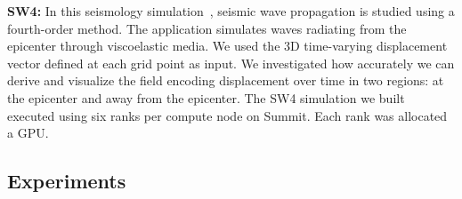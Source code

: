 \noindent\textbf{SW4:} In this seismology simulation~\cite{petersson2015wave}, seismic wave propagation is studied using a fourth-order method.
%
The application simulates waves radiating from the epicenter through viscoelastic media. 
%
%
We 
used the 3D time-varying displacement vector defined at each grid point as input.
%
We investigated how accurately we can derive and visualize the field encoding displacement over time in two regions: at the epicenter and away from the epicenter.
%
The SW4 simulation we built executed using six ranks per compute node on Summit. Each rank was allocated a GPU.
%
%

%

%
\vspace{-1mm}
\subsection{Experiments}
\label{sec:experiments}

